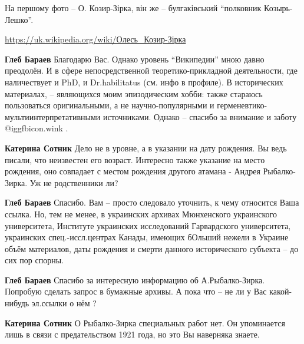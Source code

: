  
 
 
 
 
\zzSecCmt

\begin{itemize} %
На першому фото – О. Козир-Зірка, він же – булгаківський \enquote{полковник Козырь-Лешко}.


\url{https://uk.wikipedia.org/wiki/Олесь_Козир-Зірка}

\begin{itemize} %
\textbf{Глеб Бараев}
Благодарю Вас.
Однако уровень \enquote{Википедии} мною давно преодолён.
И в сфере непосредственной теоретико-прикладной деятельности, где наличествует и PhD, и Dr.habilitatus (см. инфо в профиле).
В исторических материалах, – являющихся моим эпизодическим хобби: также стараюсь пользоваться оригинальными, а не научно-популярными и герменевтико-мультиинтерпретативными источниками.
Однако – спасибо за внимание и заботу  @igg{fbicon.wink} .

\textbf{Катерина Сотник} Дело не в уровне, а в указании на дату рождения. Вы ведь писали, что неизвестен его возраст. Интересно также указание на место рождения, оно совпадает с местом рождения другого атамана - Андрея Рыбалко-Зирка. Уж не родственники ли?

\textbf{Глеб Бараев}
Спасибо.
Вам – просто следовало уточнить, к чему относится Ваша ссылка. Но, тем не менее, в украинских архивах Мюнхенского украинского университета, Институте украинских исследований Гарвардского университета, украинских спец.-иссл.центрах Канады, имеющих бОльший нежели в Украине объём материалов, даты рождения и смерти данного исторического субъекта – до сих пор спорны.

\textbf{Глеб Бараев}
Спасибо за интересную информацию об А.Рыбалко-Зирка.
Попробую сделать запрос в бумажные архивы.
А пока что – не ли у Вас какой-нибудь эл.ссылки о нём ?

\textbf{Катерина Сотник} О Рыбалко-Зирка специальных работ нет. Он упоминается лишь в связи с предательством 1921 года, но это Вы наверняка знаете.


\end{itemize}
\end{itemize}

